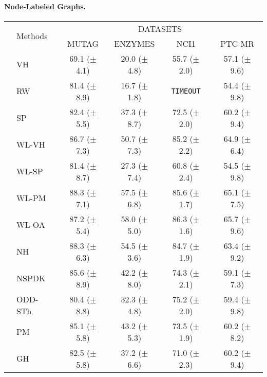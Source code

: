 \documentclass[twoside,11pt]{article}
\begin{document}
\paragraph{Node-Labeled Graphs.}

\begin{table}[!t]
\centering
\scriptsize
\def\arraystretch{1.05}
\begin{tabular}{llcccc} \toprule
& \multirow{3}{*}{Methods} & \multicolumn{4}{c}{DATASETS} \\ \cline{3-6}
& & \multirow{2}{*}{MUTAG} & \multirow{2}{*}{ENZYMES} & \multirow{2}{*}{NCI1} & \multirow{2}{*}{PTC-MR} \\
& & & & & \\ 
\midrule
\parbox[t]{2mm}{} & VH & 69.1 {\tiny ($\pm$ 4.1)} & 20.0 {\tiny ($\pm$ 4.8)} & 55.7 {\tiny ($\pm$ 2.0)} & 57.1 {\tiny ($\pm$ 9.6)} \\ 
& RW & 81.4 {\tiny ($\pm$ 8.9)} & 16.7 {\tiny ($\pm$ 1.8)} & \texttt{TIMEOUT} & 54.4 {\tiny ($\pm$ 9.8)} \\ 
& SP & 82.4 {\tiny ($\pm$ 5.5)} & 37.3 {\tiny ($\pm$ 8.7)} & 72.5 {\tiny ($\pm$ 2.0)} & 60.2 {\tiny ($\pm$ 9.4)} \\ 
& WL-VH & 86.7 {\tiny ($\pm$ 7.3)} & 50.7 {\tiny ($\pm$ 7.3)} & 85.2 {\tiny ($\pm$ 2.2)} & 64.9 {\tiny ($\pm$ 6.4)} \\ 
& WL-SP & 81.4 {\tiny ($\pm$ 8.7)} & 27.3 {\tiny ($\pm$ 7.4)} & 60.8 {\tiny ($\pm$ 2.4)} & 54.5 {\tiny ($\pm$ 9.8)} \\ 
& WL-PM & 88.3 {\tiny ($\pm$ 7.1)} & 57.5 {\tiny ($\pm$ 6.8)} & 85.6 {\tiny ($\pm$ 1.7)} & 65.1 {\tiny ($\pm$ 7.5)} \\ 
& WL-OA & 87.2 {\tiny ($\pm$ 5.4)} & 58.0 {\tiny ($\pm$ 5.0)} & 86.3 {\tiny ($\pm$ 1.6)} & 65.7 {\tiny ($\pm$ 9.6)} \\ 
& NH & 88.3 {\tiny ($\pm$ 6.3)} & 54.5 {\tiny ($\pm$ 3.6)} & 84.7 {\tiny ($\pm$ 1.9)} & 63.4 {\tiny ($\pm$ 9.2)} \\ 
& NSPDK & 85.6 {\tiny ($\pm$ 8.9)} & 42.2 {\tiny ($\pm$ 8.0)} & 74.3 {\tiny ($\pm$ 2.1)} & 59.1 {\tiny ($\pm$ 7.3)} \\ 
& ODD-STh & 80.4 {\tiny ($\pm$ 8.8)} & 32.3 {\tiny ($\pm$ 4.8)} & 75.2 {\tiny ($\pm$ 2.0)} & 59.4 {\tiny ($\pm$ 9.8)} \\ 
& PM & 85.1 {\tiny ($\pm$ 5.8)} & 43.2 {\tiny ($\pm$ 5.3)} & 73.5 {\tiny ($\pm$ 1.9)} & 60.2 {\tiny ($\pm$ 8.2)} \\ 
& GH & 82.5 {\tiny ($\pm$ 5.8)} & 37.2 {\tiny ($\pm$ 6.6)} & 71.0 {\tiny ($\pm$ 2.3)} & 60.2 {\tiny ($\pm$ 9.4)} \\ 

\end{tabular}
\end{table}
\end{document}

